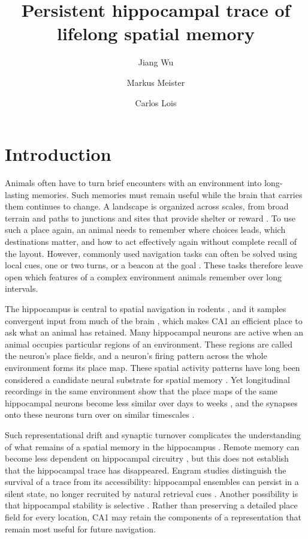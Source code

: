 \documentclass[fleqn,10pt]{wlscirep}
\title{\fontsize{18pt}{24pt}\selectfont Persistent hippocampal trace of lifelong spatial memory}
\author[1,*]{Jiang Wu}
\author[1,+,*]{Markus Meister}
\author[1,+,*]{Carlos Lois}
\affil[1]{California Institute of Technology, Division of Biology and Biological Engineering, Pasadena, 91125, USA}
\affil[*]{correspondence to: jiangwu@caltech.edu;meister@caltech.edu;clois@caltech.edu}
\affil[+]{these authors contributed equally to this work}
\begin{document}
\flushbottom
\maketitle
\thispagestyle{empty}

\linenumbers
\modulolinenumbers[1]
\section*{Introduction}
Animals often have to turn brief encounters with an environment into long-lasting memories. Such memories must remain useful while the brain that carries them continues to change. A landscape is organized across scales, from broad terrain and paths to junctions and sites that provide shelter or reward \cite{calhoun_ecology_1963, avenant_microenvironment_2003}. To use such a place again, an animal needs to remember where choices leads, which destinations matter, and how to act effectively again without complete recall of the layout. However, commonly used navigation tasks can often be solved using local cues, one or two turns, or a beacon at the goal \cite{wolbers_challenges_2014,jacobs_navigation_2014}. These tasks therefore leave open which features of a complex environment animals remember over long intervals.

The hippocampus is central to spatial navigation in rodents \cite{morris_place_1982}, and it samples convergent input from much of the brain \cite{burwell_cortical_1998}, which makes CA1 an efficient place to ask what an animal has retained. Many hippocampal neurons are active when an animal occupies particular regions of an environment. These regions are called the neuron's place fields, and a neuron's firing pattern across the whole environment forms its place map. These spatial activity patterns have long been considered a candidate neural substrate for spatial memory \cite{okeefe_hippocampus_1971, okeefe_hippocampus_1978}. Yet longitudinal recordings in the same environment show that the place maps of the same hippocampal neurons become less similar over days to weeks \cite{hainmueller_parallel_2018, gonzalez_persistence_2019, lee_statistical_2020, geva_time_2023, climer_hippocampal_2025}, and the synapses onto these neurons turn over on similar timescales \cite{attardo_impermanence_2015,pfeiffer_chronic_2018}. 

Such representational drift and synaptic turnover complicates the understanding of what remains of a spatial memory in the hippocampus \cite{zaki_memory_2025}. Remote memory can become less dependent on hippocampal circuitry \cite{winocur_preserved_2005, squire_memory_2015}, but this does not establish that the hippocampal trace has disappeared. Engram studies distinguish the survival of a trace from its accessibility: hippocampal ensembles can persist in a silent state, no longer recruited by natural retrieval cues \cite{ryan_engram_2015, kitamura_engrams_2017, josselyn_memory_2020, oleary_natural_2024}. Another possibility is that hippocampal stability is selective \cite{sato_distinct_2020, zemla_task-selective_2022, pettit_fos_2022}. Rather than preserving a detailed place field for every location, CA1 may retain the components of a representation that remain most useful for future navigation. 
\end{document}
